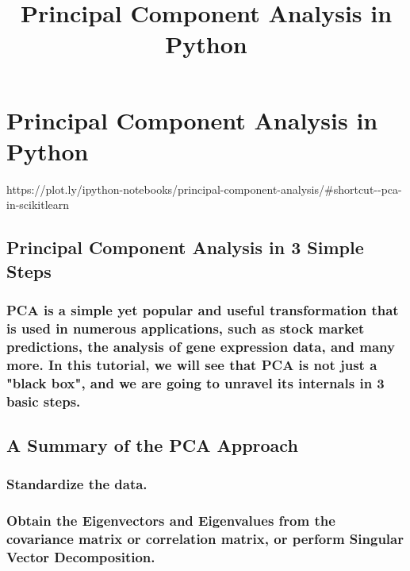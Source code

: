 \documentclass[11pt]{article}
\title{Principal Component Analysis in Python}
\begin{document}
    
    
    \maketitle
    
    

    
    \section{Principal Component Analysis in
Python}\label{principal-component-analysis-in-python}

    https://plot.ly/ipython-notebooks/principal-component-analysis/\#shortcut-\/-pca-in-scikitlearn

    \subsection{Principal Component Analysis in 3 Simple
Steps}\label{principal-component-analysis-in-3-simple-steps}

\subsubsection{PCA is a simple yet popular and useful transformation
that is used in numerous applications, such as stock market predictions,
the analysis of gene expression data, and many more. In this tutorial,
we will see that PCA is not just a "black box", and we are going to
unravel its internals in 3 basic
steps.}\label{pca-is-a-simple-yet-popular-and-useful-transformation-that-is-used-in-numerous-applications-such-as-stock-market-predictions-the-analysis-of-gene-expression-data-and-many-more.-in-this-tutorial-we-will-see-that-pca-is-not-just-a-black-box-and-we-are-going-to-unravel-its-internals-in-3-basic-steps.}

\subsection{A Summary of the PCA
Approach}\label{a-summary-of-the-pca-approach}

\subsubsection{Standardize the data.}\label{standardize-the-data.}

\subsubsection{Obtain the Eigenvectors and Eigenvalues from the
covariance matrix or correlation matrix, or perform Singular Vector
Decomposition.}\label{obtain-the-eigenvectors-and-eigenvalues-from-the-covariance-matrix-or-correlation-matrix-or-perform-singular-vector-decomposition.}
\end{document}
